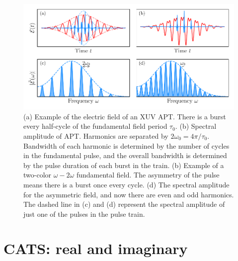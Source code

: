 \begin{figure}
	\centering
	\includegraphics[width=1.0\textwidth]{figures/Introduction/time_to_freq.pdf}
	\caption[Example electric field of XUV APT and its frequency spectrum]{(a) Example of the electric field of an XUV APT.  There is a burst every half-cycle of the fundamental field period $\tau_0$.  (b)  Spectral amplitude of APT.  Harmonics are separated by $2\omega_0=4\pi/\tau_0$.  Bandwidth of each harmonic is determined by the number of cycles in the fundamental pulse, and the overall bandwidth is determined by the pulse duration of each burst in the train. (b) Example of a two-color $\omega-2\omega$ fundamental field.  The asymmetry of the pulse means there is a burst once every cycle. (d) The spectral amplitude for the asymmetric field, and now there are even and odd harmonics.  The dashed line in (c) and (d) represent the spectral amplitude of just one of the pulses in the pulse train.}
	\label{fig:time_to_freq}
\end{figure}


\section{CATS: real and imaginary}
\label{into_theory_cats}

